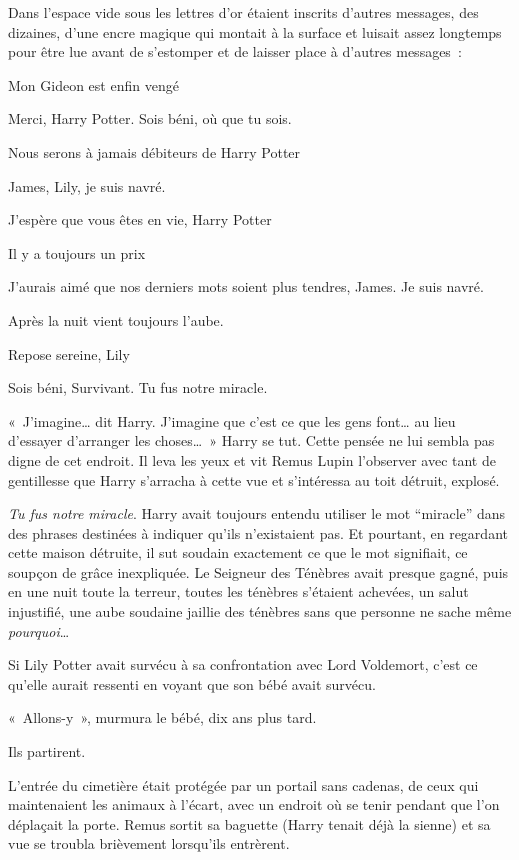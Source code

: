 Dans l'espace vide sous les lettres d'or étaient inscrits d'autres messages, des dizaines, d'une encre magique qui montait à la surface et luisait assez longtemps pour être lue avant de s'estomper et de laisser place à d'autres messages~:
\begin{center}

Mon Gideon est enfin vengé

Merci, Harry Potter. Sois béni, où que tu sois.

Nous serons à jamais débiteurs de Harry Potter

James, Lily, je suis navré.

J'espère que vous êtes en vie, Harry Potter

Il y a toujours un prix

J'aurais aimé que nos derniers mots soient plus tendres, James. Je suis navré.

Après la nuit vient toujours l'aube.

Repose sereine, Lily

Sois béni, Survivant. Tu fus notre miracle.
\end{center}

«~J'imagine… dit Harry. J'imagine que c'est ce que les gens font… au lieu d'essayer d'arranger les choses…~» Harry se tut. Cette pensée ne lui sembla pas digne de cet endroit. Il leva les yeux et vit Remus Lupin l'observer avec tant de gentillesse que Harry s'arracha à cette vue et s'intéressa au toit détruit, explosé.

\emph{Tu fus notre miracle}. Harry avait toujours entendu utiliser le mot “miracle” dans des phrases destinées à indiquer qu'ils n'existaient pas. Et pourtant, en regardant cette maison détruite, il sut soudain exactement ce que le mot signifiait, ce soupçon de grâce inexpliquée. Le Seigneur des Ténèbres avait presque gagné, puis en une nuit toute la terreur, toutes les ténèbres s'étaient achevées, un salut injustifié, une aube soudaine jaillie des ténèbres sans que personne ne sache même \emph{pourquoi}…

Si Lily Potter avait survécu à sa confrontation avec Lord Voldemort, c'est ce qu'elle aurait ressenti en voyant que son bébé avait survécu.

«~Allons-y~», murmura le bébé, dix ans plus tard.

Ils partirent.

L'entrée du cimetière était protégée par un portail sans cadenas, de ceux qui maintenaient les animaux à l'écart, avec un endroit où se tenir pendant que l'on déplaçait la porte. Remus sortit sa baguette (Harry tenait déjà la sienne) et sa vue se troubla brièvement lorsqu'ils entrèrent.

